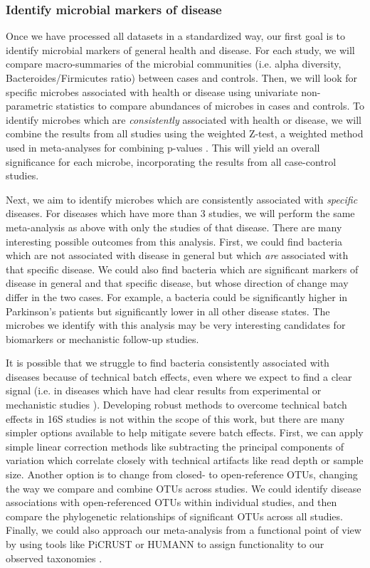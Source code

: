 \documentclass[12pt]{article}
\begin{document}
\subsubsection{Identify microbial markers of disease}\label{sec:indep_studies}
Once we have processed all datasets in a standardized way, our first 
goal is to identify microbial markers of general health and disease. 
For each study, we will compare macro-summaries of the microbial communities
(i.e. alpha diversity, Bacteroides/Firmicutes ratio) between cases and controls.
Then, we will look for specific microbes associated with health or disease using
univariate non-parametric statistics to compare abundances of microbes in cases
and controls. To identify microbes which are \textit{consistently} associated with
health or disease, we will combine the results from all studies using 
the weighted Z-test, a weighted method used in meta-analyses for combining p-values \cite{zavkin-ztest-2011}. 
This will yield an overall significance for each microbe,
incorporating the results from all case-control studies.

Next, we aim to identify microbes which are consistently associated with \textit{specific}
diseases. For diseases which have more than 3 studies, we will
perform the same meta-analysis as above with only the studies
of that disease. There are many interesting possible outcomes from this analysis.
First, we could find bacteria which are not associated with disease in general 
but which \textit{are} associated with that specific disease. 
We could also find bacteria which are significant markers of disease in general and 
that specific disease, but whose direction of change may differ in the two cases.
For example, a bacteria could be significantly higher in Parkinson's patients but
significantly lower in all other disease states. The microbes we identify with this
analysis may be very interesting candidates for biomarkers or mechanistic follow-up studies.

It is possible that we struggle to find bacteria consistently 
associated with diseases because of technical batch effects, even 
where we expect to find a clear signal (i.e. in diseases which have 
had clear results from experimental or mechanistic studies \cite{turnbaugh-energy_harvest-2006, ridaura-mouse_fmt-2013, crc_zeller}). 
Developing robust methods to overcome technical batch effects in 16S 
studies is not within the scope of this work, but there are many
simpler options available to help mitigate severe batch effects. 
First, we can apply simple linear correction methods 
like subtracting the principal components of variation which correlate closely with technical 
artifacts like read depth or sample size. 
Another option is to change from closed- to open-reference OTUs, changing the way we compare and combine OTUs across studies.
We could identify disease associations with open-referenced OTUs within individual studies, and then compare 
the phylogenetic relationships of significant OTUs across all studies. 
Finally, we could also approach our meta-analysis from a functional point of view by
using tools like PiCRUST or HUMANN to assign functionality to our
observed taxonomies \cite{langille-picrust-2013, abubucker-humann-2012}.
\end{document}
